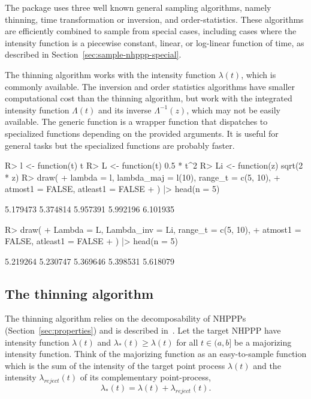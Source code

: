 \documentclass[article]{jss}\usepackage[]{graphicx}\usepackage[]{xcolor}
\newcommand{\fct}[1]{\code{#1()}}
\begin{document}
The  package uses three well known general sampling algorithms, namely thinning, time transformation or inversion, and order-statistics. These algorithms are efficiently combined to sample from special cases, including cases where the intensity function is a piecewise constant, linear, or log-linear function of time, as described in Section~\ref{sec:sample-nhppp-special}.

The thinning algorithm works with the intensity function $\lambda(t)$, which is commonly available. The inversion and order statistics algorithms have smaller computational cost than the thinning algorithm, but work with the integrated intensity function $\Lambda(t)$ and its inverse $\Lambda^{-1}(z)$, which may not be easily available. The generic function \fct{draw} is a wrapper function that dispatches to specialized functions depending on the provided arguments. It is useful for general tasks but the specialized functions are probably faster.

\begin{Schunk}
\begin{Sinput}
R> l <- function(t) t
R> L <- function(t) 0.5 * t^2
R> Li <- function(z) sqrt(2 * z)
R> draw(
+    lambda = l, lambda_maj = l(10), range_t = c(5, 10),
+    atmost1 = FALSE, atleast1 = FALSE
+  ) |> head(n = 5)
\end{Sinput}
\begin{Soutput}
[1] 5.179473 5.374814 5.957391 5.992196 6.101935
\end{Soutput}
\begin{Sinput}
R> draw(
+    Lambda = L, Lambda_inv = Li, range_t = c(5, 10),
+    atmost1 = FALSE, atleast1 = FALSE
+  ) |> head(n = 5)
\end{Sinput}
\begin{Soutput}
[1] 5.219264 5.230747 5.369646 5.398531 5.618079
\end{Soutput}
\end{Schunk}

\subsection{The thinning algorithm}\label{sec:thinning}
The thinning algorithm relies on the decomposability of NHPPPs (Section~\ref{sec:properties}) and is described in~\citet{lewis1979thinning}. Let the target NHPPP have intensity function $\lambda(t)$ and $\lambda_*(t) \ge \lambda(t)$ for all $t \in (a, b]$ be a majorizing intensity function. Think of the majorizing function as an easy-to-sample function which is the sum of the intensity of the target point process $\lambda(t)$ and the intensity $\lambda_{reject}(t)$ of its complementary point-process,
$$\lambda_*(t) = \lambda(t) + \lambda_{reject}(t).$$
\end{document}
